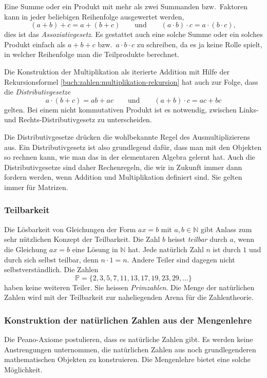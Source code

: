 Eine Summe oder ein Produkt mit mehr als zwei Summanden bzw.~Faktoren
kann in jeder beliebigen Reihenfolge ausgewertet werden,
\[
(a+b)+c
=
a+(b+c)
\qquad\text{und}\qquad
(a\cdot b)\cdot c
=
a\cdot (b\cdot c),
\]
dies ist das {\em Assoziativgesetz}.
Es gestattet auch eine solche Summe oder ein solches Produkt einfach
als $a+b+c$ bzw.~$a\cdot b\cdot c$ zu schreiben, da es ja keine Rolle
spielt, in welcher Reihenfolge man die Teilprodukte berechnet.

Die Konstruktion der Multiplikation als iterierte Addition mit Hilfe
der Rekursionsformel \eqref{buch:zahlen:multiplikation-rekursion}
hat auch zur Folge, dass die {\em Distributivgesetze}
%
\[
a\cdot(b+c) = ab+ac
\qquad\text{und}\qquad
(a+b)\cdot c = ac+bc
\]
gelten.
Bei einem nicht kommutativen Produkt ist es notwendig,
zwischen Links- und Rechts-Distributivgesetz zu unterscheiden.

Die Distributivgesetze drücken die wohlbekannte Regel des
Ausmultiplizierens aus.
Ein Distributivgesetz ist also grundlegend dafür, dass man mit den
Objekten so rechnen kann, wie man das in der elementaren Algebra 
gelernt hat.
Auch die Distributivgesetze sind daher Rechenregeln, die wir in
Zukunft immer dann fordern werden, wenn Addition und Multiplikation
definiert sind.
Sie gelten immer für Matrizen.

\subsubsection{Teilbarkeit}
Die Lösbarkeit von Gleichungen der Form $ax=b$ mit $a,b\in\mathbb{N}$
gibt Anlass zum sehr nützlichen Konzept der Teilbarkeit.
%
Die Zahl $b$ heisst {\em teilbar} durch $a$, wenn die Gleichung $ax=b$ eine
Lösung in $\mathbb{N}$ hat.
%
Jede natürlich Zahl $n$ ist durch $1$ und durch sich selbst teilbar,
denn $n\cdot 1 = n$.
Andere Teiler sind dagegen nicht selbstverständlich.
Die Zahlen
\[
\mathbb{P}
=
\{2,3,5,7,11,13,17,19,23,29,\dots\}
\]
haben keine weiteren Teiler. Sie heissen {\em Primzahlen}.
%
Die Menge der natürlichen Zahlen wird mit der Teilbarkeit zur naheliegenden
Arena für die Zahlentheorie.
%

\subsubsection{Konstruktion der natürlichen Zahlen aus der Mengenlehre}
Die Peano-Axiome postulieren, dass es natürliche Zahlen gibt.
Es werden keine Anstrengungen unternommen, die natürlichen Zahlen
aus noch grundlegenderen mathematischen Objekten zu konstruieren.
Die Mengenlehre bietet eine solche Möglichkeit.

